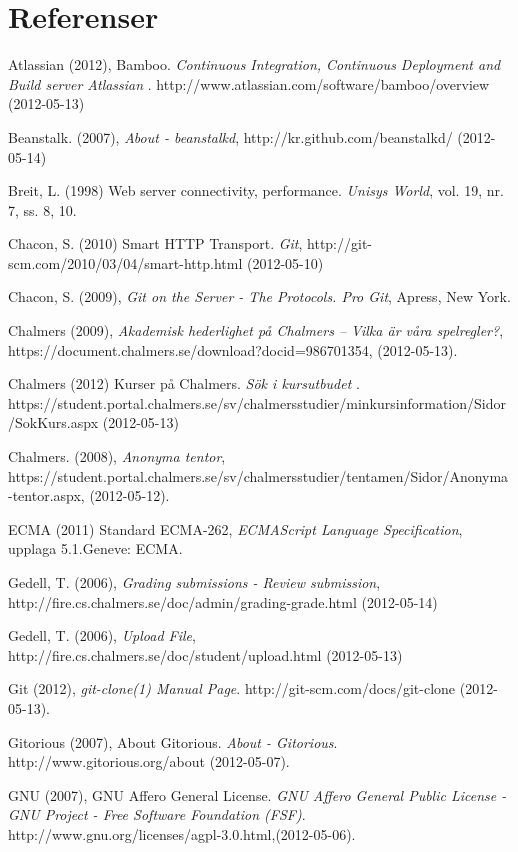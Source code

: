 
\renewcommand{\thechapter}{}
\chapter{Referenser}
\begin{flushleft}
\small
Atlassian (2012), Bamboo. \emph{Continuous Integration, Continuous Deployment and Build server Atlassian  }. http://www.atlassian.com/software/bamboo/overview (2012-05-13)

Beanstalk. (2007), \emph{About - beanstalkd}, http://kr.github.com/beanstalkd/ (2012-05-14)

Breit, L. (1998) Web server connectivity, performance. \emph{Unisys World}, vol. 19, nr. 7, ss. 8, 10.

Chacon, S. (2010) Smart HTTP Transport. \emph{Git}, http://git-scm.com/2010/03/04/smart-http.html (2012-05-10)

Chacon, S. (2009), \emph{Git on the Server - The Protocols. Pro Git}, Apress, New York.

Chalmers (2009), \emph{Akademisk hederlighet på Chalmers – Vilka är våra spelregler?}, https://document.chalmers.se/download?docid=986701354, (2012-05-13).

Chalmers (2012) Kurser på Chalmers. \emph{Sök i kursutbudet} . https://student.portal.chalmers.se/sv/chalmersstudier/minkursinformation/Sidor/SokKurs.aspx (2012-05-13)

Chalmers. (2008), \emph{Anonyma tentor}, https://student.portal.chalmers.se/sv/chalmersstudier/tentamen/Sidor/Anonyma-tentor.aspx, (2012-05-12).

ECMA (2011) Standard ECMA-262, \emph{ECMAScript Language Specification}, upplaga 5.1.Geneve: ECMA.

Gedell, T. (2006), \emph{Grading submissions - Review submission}, http://fire.cs.chalmers.se/doc/admin/grading-grade.html (2012-05-14)

Gedell, T. (2006), \emph{Upload File}, http://fire.cs.chalmers.se/doc/student/upload.html (2012-05-13)

Git (2012), \emph{git-clone(1) Manual Page}. http://git-scm.com/docs/git-clone (2012-05-13).

Gitorious (2007), About Gitorious. \emph{ About - Gitorious}. http://www.gitorious.org/about (2012-05-07).

GNU (2007), GNU Affero General License. \emph{GNU Affero General Public License - GNU Project - Free Software Foundation (FSF)}. http://www.gnu.org/licenses/agpl-3.0.html,(2012-05-06).


\end{flushleft}
